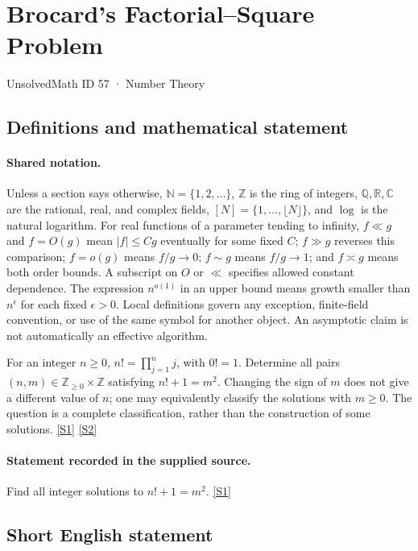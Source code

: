 \documentclass[11pt,a4paper]{article}
\newcommand{\N}{\mathbb{N}}
\newcommand{\Z}{\mathbb{Z}}
\newcommand{\Q}{\mathbb{Q}}
\newcommand{\R}{\mathbb{R}}
\newcommand{\C}{\mathbb{C}}
\newcommand{\sref}[2]{\hyperlink{source:#1:#2}{[S#2]}}
\begin{document}

\setcounter{section}{56}

\section{Brocard's Factorial--Square Problem}\label{57}

{\small\sffamily UnsolvedMath ID 57 · Number Theory}

\subsection{Definitions and mathematical statement}

\paragraph{Shared notation.}Unless a section says otherwise, $\N=\{1,2,\ldots\}$,
$\Z$ is the ring of integers, $\Q,\R,\C$ are the rational, real, and complex
fields, $[N]=\{1,\ldots,\lfloor N\rfloor\}$, and $\log$ is the natural
logarithm. For real functions of a parameter tending to infinity,
$f\ll g$ and $f=O(g)$ mean $|f|\leq Cg$ eventually for some fixed $C$;
$f\gg g$ reverses this comparison; $f=o(g)$ means $f/g\to0$;
$f\sim g$ means $f/g\to1$; and $f\asymp g$ means both order bounds.
A subscript on $O$ or $\ll$ specifies allowed constant dependence.
The expression $n^{o(1)}$ in an upper bound means growth smaller than
$n^\epsilon$ for each fixed $\epsilon>0$. Local definitions govern any
exception, finite-field convention, or use of the same symbol for another
object. An asymptotic claim is not automatically an effective algorithm.



For an integer $n\geq0$, $n!=\prod_{j=1}^{n}j$, with $0!=1$. Determine all pairs $(n,m)\in\Z_{\geq0}\times\Z$ satisfying $n!+1=m^2$. Changing the sign of $m$ does not give a different value of $n$; one may equivalently classify the solutions with $m\geq0$. The question is a complete classification, rather than the construction of some solutions. \sref{57}{1} \sref{57}{2}

\paragraph{Statement recorded in the supplied source.}
Find all integer solutions to $n! + 1 = m^2$. \sref{57}{1}

\subsection{Short English statement}
\end{document}
